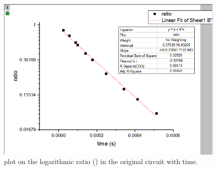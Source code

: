 \begin{figure}[!htbp]
	\centering %
	\includegraphics[width=\linewidth]{images/2_2.PNG} %
	\caption{plot on the logarithmic ratio ({\tiny }) in the original circuit with time.} %
	\label{fig:2.2} %
\end{figure}

